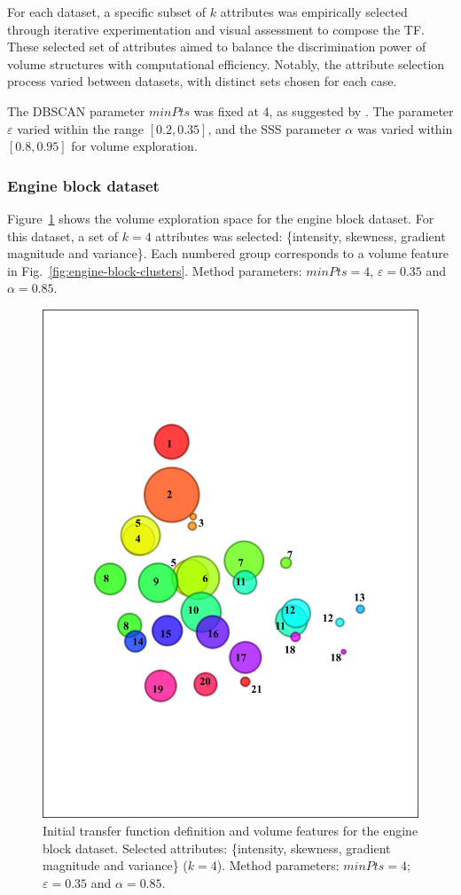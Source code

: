 For each dataset, a specific subset of \(k\) attributes was empirically selected through iterative experimentation and visual assessment to compose the TF. These selected set of attributes aimed to balance the discrimination power of volume structures with computational efficiency. Notably, the attribute selection process varied between datasets, with distinct sets chosen for each case.

The DBSCAN parameter $minPts$ was fixed at 4, as suggested by \citet{ester1996}. The parameter $\varepsilon$ varied within the range $[0.2, 0.35]$, and the SSS parameter $\alpha$ was varied within $[0.8, 0.95]$ for volume exploration.


\subsubsection{Engine block dataset}
\label{subsubsec:engine-block}

Figure~\ref{fig:engine-block-clusters-tf} shows the volume exploration space for the engine block dataset. For this dataset, a set of \(k = 4\) attributes was selected: \{intensity, skewness, gradient magnitude and variance\}. Each numbered group corresponds to a volume feature in Fig.~\ref{fig:engine-block-clusters}. Method parameters: $minPts=4$, $\varepsilon=0.35$ and $\alpha=0.85$.

\begin{figure}[htb!]
    \centering
    \includegraphics[width=0.6\columnwidth]{figs/engine-block-clusters-tf.jpg}
    \caption{Initial transfer function definition and volume features for the engine block dataset. Selected attributes: \{intensity, skewness, gradient magnitude and variance\} (\(k=4\)). Method parameters: $minPts=4$; $\varepsilon=0.35$ and $\alpha=0.85$.}
    \label{fig:engine-block-clusters-tf}
\end{figure}

